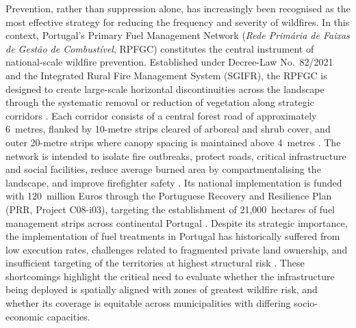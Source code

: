Prevention, rather than suppression alone, has increasingly been recognised as the
most effective strategy for reducing the frequency and severity of wildfires. In this
context, Portugal's Primary Fuel Management Network (\textit{Rede Primária de Faixas
de Gestão de Combustível}, RPFGC) constitutes the central instrument of national-scale
wildfire prevention. Established under Decree-Law No.~82/2021 and the Integrated Rural
Fire Management System (SGIFR), the RPFGC is designed to create large-scale horizontal
discontinuities across the landscape through the systematic removal or reduction of
vegetation along strategic corridors \cite{ICNF_RPFGC}. Each corridor consists of a
central forest road of approximately 6~metres, flanked by 10-metre strips cleared of
arboreal and shrub cover, and outer 20-metre strips where canopy spacing is maintained
above 4~metres \cite{CmPenamacor2025}. The network is intended to isolate fire
outbreaks, protect roads, critical infrastructure and social facilities, reduce average
burned area by compartmentalising the landscape, and improve firefighter safety
\cite{RecuperarPortugal_C08}. Its national implementation is funded with
120~million Euros through the Portuguese Recovery and Resilience Plan (PRR, Project
C08-i03), targeting the establishment of 21,000~hectares of fuel management strips
across continental Portugal \cite{Transparencia_C08}. Despite its strategic importance,
the implementation of fuel treatments in Portugal has historically suffered from low
execution rates, challenges related to fragmented private land ownership, and
insufficient targeting of the territories at highest structural risk
\cite{FrontiersPortugal2023}. These shortcomings highlight the critical need to
evaluate whether the infrastructure being deployed is spatially aligned with zones of
greatest wildfire risk, and whether its coverage is equitable across municipalities
with differing socio-economic capacities.\\

